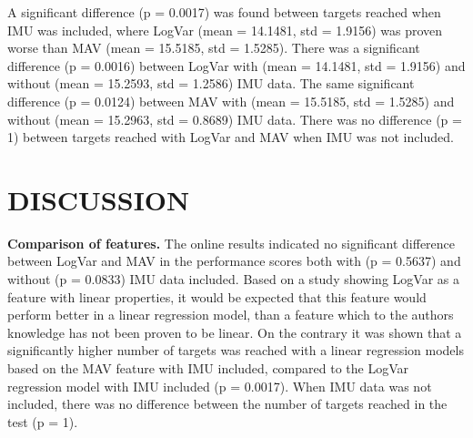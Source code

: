 \begin{multicols}{2}
	
		\begin{center}
		\end{center}
	
	A significant difference (p = 0.0017) was found between targets reached when IMU was included, where LogVar (mean = 14.1481, std = 1.9156) was proven worse than MAV (mean = 15.5185, std = 1.5285). There was a significant difference (p = 0.0016) between LogVar with (mean = 14.1481, std = 1.9156) and without (mean = 15.2593, std = 1.2586) IMU data. The same significant difference (p = 0.0124) between MAV with (mean = 15.5185, std = 1.5285) and without (mean = 15.2963, std = 0.8689) IMU data. There was no difference (p = 1) between targets reached with LogVar and MAV when IMU was not included.
	
\section{DISCUSSION}%
	
%		
\textbf{Comparison of features.}
The online results indicated no significant difference between LogVar and MAV in the performance scores both with (p = 0.5637) and without (p = 0.0833) IMU data included. Based on a study \cite{hahne2014} showing LogVar as a feature with linear properties, it would be expected that this feature would perform better in a linear regression model, than a feature which to the authors knowledge has not been proven to be linear. On the contrary it was shown that a significantly higher number of targets was reached with a linear regression models based on the MAV feature with IMU included, compared to the LogVar regression model with IMU included (p = 0.0017). When IMU data was not included, there was no difference between the number of targets reached in the test (p = 1).


\end{multicols}

